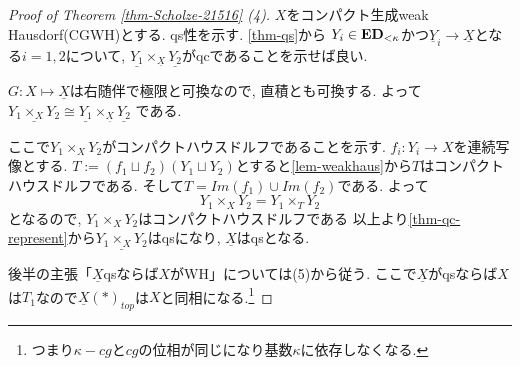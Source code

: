 \documentclass[dvipdfmx,a4paper,11pt]{report}
\theoremstyle{definition}
\begin{document}
\begin{proof}[Proof of Theorem \ref{thm-Scholze-21516} (4)]

$X$をコンパクト生成weak Hausdorf(CGWH)とする.
qs性を示す. \ref{thm-qs}から
$Y_i \in {\bf ED}_{< \kappa}$かつ$\underline{Y}_{i} \to \underline{X}$となる$i=1,2$について, 
$\underline{Y_1} \times_{\underline{X}} \underline{Y_2}$がqcであることを示せば良い. 

$G : X \mapsto \underline{X} $は右随伴で極限と可換なので, 直積とも可換する.
よって
$\underline{Y_1 \times_{X} Y_2} \cong \underline{Y_1} \times_{\underline{X}} \underline{Y_2}$
である.

ここで$Y_1 \times_{X} Y_2$がコンパクトハウスドルフであることを示す. 
$f_i : Y_i \to X$を連続写像とする. 
$T := (f_1 \sqcup f_2)(Y_1 \sqcup Y_2)$とすると\ref{lem-weakhaus}から$T$はコンパクトハウスドルフである.
そして$T = Im(f_1) \cup Im(f_2)$である. 
よって
$$
Y_1 \times_{X} Y_2 = Y_1 \times_{T} Y_2
$$
となるので, $Y_1 \times_{X} Y_2$はコンパクトハウスドルフである
以上より\ref{thm-qc-represent}から$\underline{Y_1 \times_{X} Y_2}$はqsになり, $\underline{X}$はqsとなる. 

後半の主張「$\underline{X}$qsならば$X$がWH」については(5)から従う. 
ここで$\underline{X}$がqsならば$X$は$T_1$なので$\underline{X}(\ast)_{top} $は$X$と同相になる.\footnote{つまり$\kappa-cg$と$cg$の位相が同じになり基数$\kappa$に依存しなくなる. } 

\end{proof}
\end{document}
